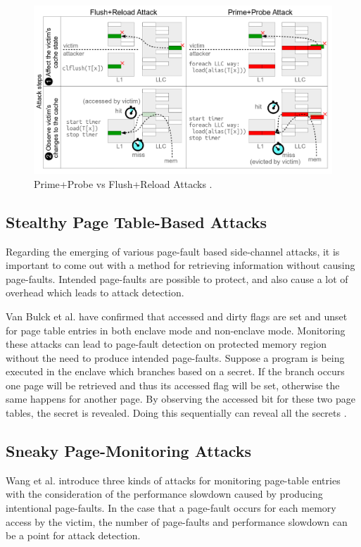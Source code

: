 \begin{figure}
	\includegraphics[scale=0.28]{images/ppfr}
	\caption{Prime+Probe vs Flush+Reload Attacks \cite{kayaalp2016high}.}
	\label{fig:ppfr}
\end{figure}

\subsection{Stealthy Page Table-Based Attacks}
Regarding the emerging of various page-fault based side-channel attacks, it is important to come out with a method for retrieving information without causing page-faults. Intended page-faults are possible to protect, and also cause a lot of overhead which leads to attack detection.

Van Bulck et al. \cite{stealthy} have confirmed that accessed and dirty flags are set and unset for page table entries in both enclave mode and non-enclave mode. Monitoring these attacks can lead to page-fault detection on protected memory region without the need to produce intended page-faults. Suppose a program is being executed in the enclave which branches based on a secret. If the branch occurs one page will be retrieved and thus its accessed flag will be set, otherwise the same happens for another page. By observing the accessed bit for these two page tables, the secret is revealed. Doing this sequentially can reveal all the secrets \cite{stealthy}.


\subsection{Sneaky Page-Monitoring Attacks}
Wang et al. \cite{leakycauldron} introduce three kinds of attacks for monitoring page-table entries with the consideration of the performance slowdown caused by producing intentional page-faults. In the case that a page-fault occurs for each memory access by the victim, the number of page-faults and performance slowdown can be a point for attack detection.
